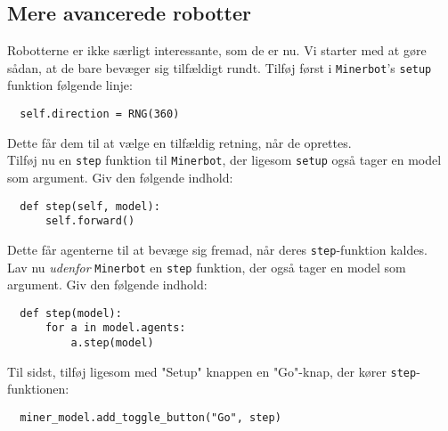 \documentclass[12pt]{article}
\begin{document}
\subsection{Mere avancerede robotter}
Robotterne er ikke særligt interessante, som de er nu. Vi starter med at gøre sådan, at de bare bevæger sig tilfældigt rundt. Tilføj først i \texttt{Minerbot}'s \texttt{setup} funktion følgende linje:
\begin{lstlisting}
  self.direction = RNG(360)
\end{lstlisting}
Dette får dem til at vælge en tilfældig retning, når de oprettes.\\
Tilføj nu en \texttt{step} funktion til \texttt{Minerbot}, der ligesom \texttt{setup} også tager en model som argument. Giv den følgende indhold:
\begin{lstlisting}
  def step(self, model):
      self.forward()
\end{lstlisting}
Dette får agenterne til at bevæge sig fremad, når deres \texttt{step}-funktion kaldes.\\
Lav nu \textit{udenfor} \texttt{Minerbot} en \texttt{step} funktion, der også tager en model som argument. Giv den følgende indhold:
\begin{lstlisting}
  def step(model):
      for a in model.agents:
          a.step(model)
\end{lstlisting}
Til sidst, tilføj ligesom med "Setup" knappen en "Go"-knap, der kører \texttt{step}-funktionen:
\begin{lstlisting}
  miner_model.add_toggle_button("Go", step)
\end{lstlisting}
\end{document}
